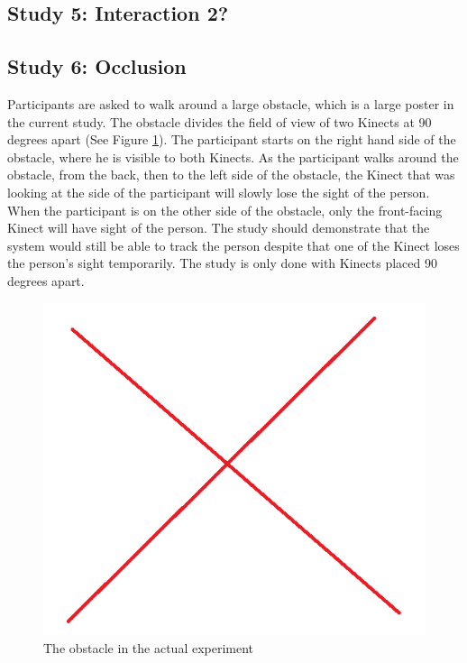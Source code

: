 \documentclass{sigchi}
\begin{document}
\subsection{Study 5: Interaction 2?}

\subsection{Study 6: Occlusion}

Participants are asked to walk around a large obstacle, which is a large poster in the current study. The obstacle divides the field of view of two Kinects at 90 degrees apart (See Figure \ref{fig:studies_obstacle}). The participant starts on the right hand side of the obstacle, where he is visible to both Kinects. As the participant walks around the obstacle, from the back, then to the left side of the obstacle, the Kinect that was looking at the side of the participant will slowly lose the sight of the person. When the participant is on the other side of the obstacle, only the front-facing Kinect will have sight of the person. The study should demonstrate that the system would still be able to track the person despite that one of the Kinect loses the person's sight temporarily. The study is only done with Kinects placed 90 degrees apart.

\begin{figure}[!h]
  \centering
  \includegraphics[width=0.9\columnwidth]{studies_obstacle}
  \caption{The obstacle in the actual experiment}
  \label{fig:studies_obstacle}
\end{figure}
\end{document}
